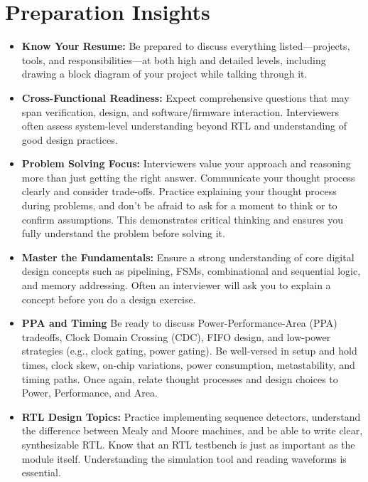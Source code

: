 \documentclass[11pt]{article}
\begin{document}
\section{Preparation Insights}
\begin{itemize}
    \item \textbf{Know Your Resume:} Be prepared to discuss everything
    listed—projects, tools, and responsibilities—at both high and detailed
    levels, including drawing a block diagram of your project while talking
    through it.

    \item \textbf{Cross-Functional Readiness:} Expect comprehensive questions
    that may span verification, design, and software/firmware interaction.
    Interviewers often assess system-level understanding beyond RTL and
    understanding of good design practices.

    \item \textbf{Problem Solving Focus:} Interviewers value your approach and
    reasoning more than just getting the right answer. Communicate your thought
    process clearly and consider trade-offs. Practice explaining your thought
    process during problems, and don't be afraid to ask for a moment to think
    or to confirm assumptions. This demonstrates critical thinking and ensures
    you fully understand the problem before solving it.

    \item \textbf{Master the Fundamentals:} Ensure a strong understanding of
    core digital design concepts such as pipelining, FSMs, combinational and
    sequential logic, and memory addressing. Often an interviewer will ask you
    to explain a concept before you do a design exercise.

    \item \textbf{PPA and Timing} Be ready to discuss Power-Performance-Area
    (PPA) tradeoffs, Clock Domain Crossing (CDC), FIFO design, and low-power
    strategies (e.g., clock gating, power gating). Be well-versed in setup and
    hold times, clock skew, on-chip variations, power consumption,
    metastability, and timing paths. Once again, relate thought processes and
    design choices to Power, Performance, and Area.

    \item \textbf{RTL Design Topics:} Practice implementing sequence detectors,
    understand the difference between Mealy and Moore machines, and be able to
    write clear, synthesizable RTL. Know that an RTL testbench is just as
    important as the module itself. Understanding the simulation tool and
    reading waveforms is essential.


\end{itemize}
\end{document}
